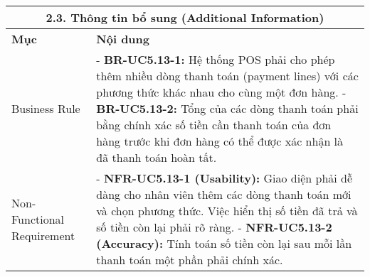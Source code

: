 \begin{longtable}{|m{4cm}|p{11cm}|}
\hline
\multicolumn{2}{|c|}{\textbf{2.3. Thông tin bổ sung (Additional Information)}} \\
\hline
\textbf{Mục} & \textbf{Nội dung} \\
\hline
Business Rule & - \textbf{BR-UC5.13-1:} Hệ thống POS phải cho phép thêm nhiều dòng thanh toán (payment lines) với các phương thức khác nhau cho cùng một đơn hàng. \newline - \textbf{BR-UC5.13-2:} Tổng của các dòng thanh toán phải bằng chính xác số tiền cần thanh toán của đơn hàng trước khi đơn hàng có thể được xác nhận là đã thanh toán hoàn tất. \\
\hline
Non-Functional Requirement & - \textbf{NFR-UC5.13-1 (Usability):} Giao diện phải dễ dàng cho nhân viên thêm các dòng thanh toán mới và chọn phương thức. Việc hiển thị số tiền đã trả và số tiền còn lại phải rõ ràng. \newline - \textbf{NFR-UC5.13-2 (Accuracy):} Tính toán số tiền còn lại sau mỗi lần thanh toán một phần phải chính xác. \\
\hline
\end{longtable}

